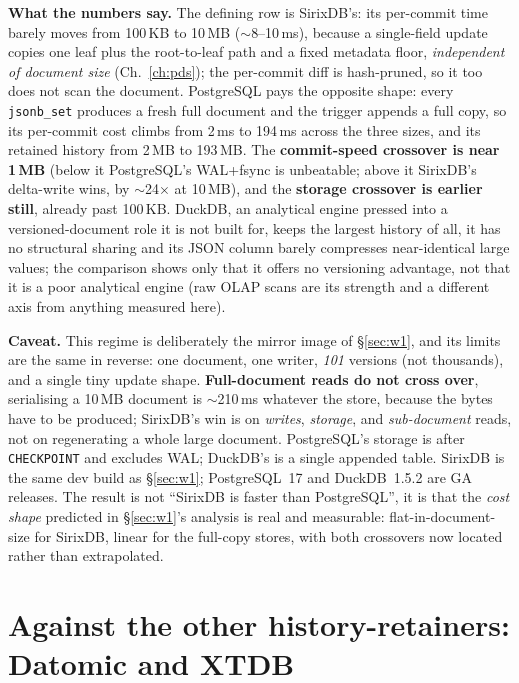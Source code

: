 \documentclass[11pt,a4paper,oneside]{report}
\theoremstyle{sirixthm}
\newcommand{\code}[1]{\texttt{#1}}
\begin{document}
\textbf{What the numbers say.} The defining row is SirixDB's: its per-commit time barely moves from
100\,KB to 10\,MB ($\sim$8--10\,ms), because a single-field update copies one leaf plus the root-to-leaf
path and a fixed metadata floor, \emph{independent of document size} (Ch.~\ref{ch:pds}); the per-commit
diff is hash-pruned, so it too does not scan the document. PostgreSQL pays the opposite shape: every
\code{jsonb\_set} produces a fresh full document and the trigger appends a full copy, so its per-commit
cost climbs from 2\,ms to 194\,ms across the three sizes, and its retained history from 2\,MB to 193\,MB.
The \textbf{commit-speed crossover is near 1\,MB} (below it PostgreSQL's WAL{+}fsync is unbeatable; above
it SirixDB's delta-write wins, by $\sim$24$\times$ at 10\,MB), and the \textbf{storage crossover is
earlier still}, already past 100\,KB. DuckDB, an analytical engine pressed into a versioned-document
role it is not built for, keeps the largest history of all, it has no structural sharing and its JSON
column barely compresses near-identical large values; the comparison shows only that it offers no
versioning advantage, not that it is a poor analytical engine (raw OLAP scans are its strength and a
different axis from anything measured here).

\begin{honesty}
\small\textbf{Caveat.} This regime is deliberately the mirror image of \S\ref{sec:w1}, and its limits are
the same in reverse: one document, one writer, \emph{101} versions (not thousands), and a single tiny
update shape. \textbf{Full-document reads do not cross over}, serialising a 10\,MB document is
$\sim$210\,ms whatever the store, because the bytes have to be produced; SirixDB's win is on
\emph{writes}, \emph{storage}, and \emph{sub-document} reads, not on regenerating a whole large document.
PostgreSQL's storage is after \code{CHECKPOINT} and excludes WAL; DuckDB's is a single appended table.
SirixDB is the same dev build as \S\ref{sec:w1}; PostgreSQL~17 and DuckDB~1.5.2 are GA releases. The
result is not ``SirixDB is faster than PostgreSQL'', it is that the \emph{cost shape} predicted in
\S\ref{sec:w1}'s analysis is real and measurable: flat-in-document-size for SirixDB, linear for the
full-copy stores, with both crossovers now located rather than extrapolated.
\end{honesty}

\section{Against the other history-retainers: Datomic and XTDB}
\label{sec:retainers}
\end{document}
